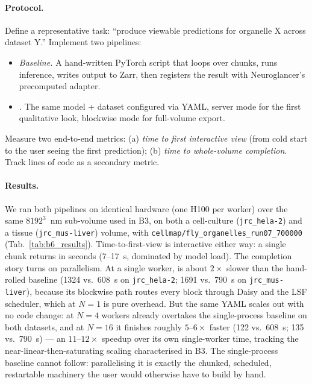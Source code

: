 \paragraph{Protocol.} Define a representative task: ``produce viewable predictions for organelle X across dataset Y.'' Implement two pipelines:
\begin{itemize}
\item \emph{Baseline.} A hand-written PyTorch script that loops over chunks, runs inference, writes output to Zarr, then registers the result with Neuroglancer's precomputed adapter.
\item \emph{\cellmapflow{}.} The same model + dataset configured via YAML, server mode for the first qualitative look, blockwise mode for full-volume export.
\end{itemize}
Measure two end-to-end metrics: (a) \emph{time to first interactive view} (from cold start to the user seeing the first prediction); (b) \emph{time to whole-volume completion}. Track lines of code as a secondary metric.

\paragraph{Results.} We ran both pipelines on identical hardware (one H100 per worker) over the same $8192^3$~nm sub-volume used in B3, on both a cell-culture (\texttt{jrc\_hela-2}) and a tissue (\texttt{jrc\_mus-liver}) volume, with \texttt{cellmap/fly\_organelles\_run07\_700000} (Tab.~\ref{tab:b6_results}). Time-to-first-view is interactive either way: a single chunk returns in seconds (7--17~s, dominated by model load). The completion story turns on parallelism. At a single worker, \cellmapflow{} is about $2\times$ slower than the hand-rolled baseline (1324 vs.\ 608~s on \texttt{jrc\_hela-2}; 1691 vs.\ 790~s on \texttt{jrc\_mus-liver}), because its blockwise path routes every block through Daisy and the LSF scheduler, which at $N{=}1$ is pure overhead. But the same YAML scales out with no code change: at $N{=}4$ workers \cellmapflow{} already overtakes the single-process baseline on both datasets, and at $N{=}16$ it finishes roughly $5$--$6\times$ faster (122 vs.\ 608~s; 135 vs.\ 790~s) --- an $11$--$12\times$ speedup over its own single-worker time, tracking the near-linear-then-saturating scaling characterised in B3. The single-process baseline cannot follow: parallelising it is exactly the chunked, scheduled, restartable machinery the user would otherwise have to build by hand.

